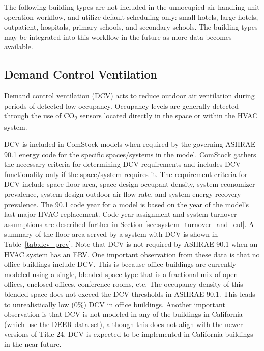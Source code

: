 The following building types are not included in the unnocupied air handling unit operation workflow, and utilize default scheduling only: small hotels, large hotels, outpatient, hospitals, primary schools, and secondary schools. The building types may be integrated into this workflow in the future as more data becomes available.




\subsection{Demand Control Ventilation}

Demand control ventilation (DCV) acts to reduce outdoor air ventilation during periods of detected low occupancy. Occupancy levels are generally detected through the use of CO\textsubscript{2} sensors located directly in the space or within the HVAC system.

DCV is included in ComStock models when required by the governing ASHRAE-90.1 energy code for the specific spaces/systems in the model. ComStock gathers the necessary criteria for determining DCV requirements and includes DCV functionality only if the space/system requires it. The requirement criteria for DCV include space floor area, space design occupant density, system economizer prevalence, system design outdoor air flow rate, and system energy recovery prevalence. The 90.1 code year for a model is based on the year of the model's last major HVAC replacement. Code year assignment and system turnover assumptions are described further in Section \ref{sec:system_turnover_and_eul}. A summary of the floor area served by a system with DCV is shown in Table~\ref{tab:dcv_prev}. Note that DCV is not required by ASHRAE 90.1 when an HVAC system has an ERV. One important observation from these data is that no office buildings include DCV. This is because office buildings are currently modeled using a single, blended space type that is a fractional mix of open offices, enclosed offices, conference rooms, etc. The occupancy density of this blended space does not exceed the DCV thresholds in ASHRAE 90.1. This leads to unrealistically low (0\%) DCV in office buildings. Another important observation is that DCV is not modeled in any of the buildings in California (which use the DEER data set), although this does not align with the newer versions of Title 24. DCV is expected to be implemented in California buildings in the near future.


